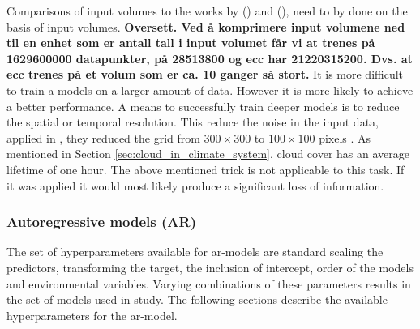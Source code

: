 Comparisons of input volumes to the works by \citeauthor{precip_nowcasting} (\citeyear{precip_nowcasting}) and \citeauthor{SunAirLSTM} (\citeyear{SunAirLSTM}), need to by done on the basis of input volumes. %
\textbf{Oversett. Ved å komprimere input volumene ned til en enhet som er antall tall i input volumet får vi at  trenes på 1629600000 datapunkter,  på 28513800 og \acrshort{ecc} har 21220315200. Dvs. at \acrshort{ecc} trenes på et volum som er ca. 10 ganger så stort.}
It is more difficult to train a models on a larger amount of data. However it is more likely to achieve a better performance. A means to successfully train deeper models is to reduce the spatial or temporal resolution. This reduce the noise in the input data, applied in , they reduced the grid from $300\times300$ to $100\times100$ pixels . As mentioned in Section \ref{sec:cloud_in_climate_system}, cloud cover has an average lifetime of one hour. The above mentioned trick is not applicable to this task. If it was applied it would most likely produce a significant loss of information.

\subsubsection{Autoregressive models (AR)}
The set of hyperparameters available for \acrshort{ar}-models are
standard scaling the predictors, transforming the target, the inclusion of intercept, order of the models and environmental variables. Varying combinations of these parameters results in the set of models used in study. The following sections describe the available hyperparameters for the \acrshort{ar}-model.



